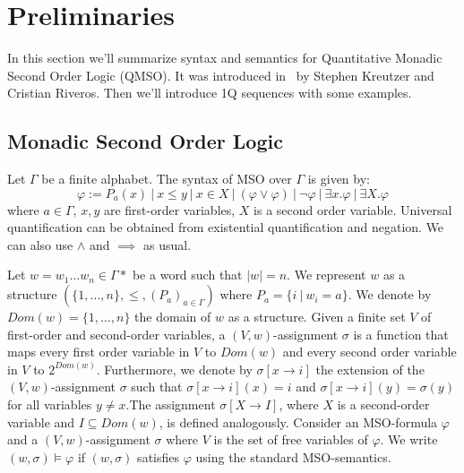 \documentclass[12pt]{article}
\newcommand{\ifilip}[1]{\todo[inline,color=green!10]{{\bf Filip:} #1}}
\theoremstyle{definition}
\begin{document}



\section{Preliminaries}
In this section we'll summarize syntax and semantics for Quantitative Monadic Second Order Logic (QMSO). It was introduced in~\cite{KreutzerR13} by Stephen Kreutzer and Cristian Riveros. Then we'll introduce 1Q sequences with some examples.

\subsection{Monadic Second Order Logic}

Let $\Gamma$ be a finite alphabet. The syntax of MSO over $\Gamma$ is given by:
$$ \varphi := P_a(x) \ | \ x \leq y \ | \ x \in X \ | \ (\varphi \lor \varphi) \ | \ \neg \varphi \ | \ \exists x. \varphi \ | \ \exists X . \varphi $$
where $a \in \Gamma$, $x, y$ are first-order variables, $X$ is a second order variable. Universal quantification can be obtained from existential quantification and negation. We can also use $\land$ and $\implies$ as usual.

Let $w = w_1\ldots w_n \in \Gamma*$ be a word such that $|w| = n$. We represent $w$ as a structure $(\{1,\ldots,n\}, \leq, (P_a)_{a \in \Gamma})$ where $P_a = \{i \ | \ w_i = a\}$. We denote by $Dom(w) = \{1,\ldots,n\}$ the domain of $w$ as a structure. Given a finite set $V$ of first-order and second-order variables, a $(V,w)$-assignment $\sigma$ is a function that maps every first order variable in $V$ to $Dom(w)$ and every second order variable in $V$ to $2^{Dom(w)}$. Furthermore, we denote by $\sigma[x \rightarrow i]$ the extension of the $(V,w)$-assignment $\sigma$ such that $\sigma[x \rightarrow i](x) = i$ and $\sigma[x \rightarrow i](y) = \sigma(y)$ for all variables $y \ne x$.The assignment $\sigma[X \rightarrow I]$, where $X$ is a second-order variable and $I \subseteq Dom(w)$, is defined analogously. Consider an MSO-formula $\varphi$ and a $(V,w)$-assignment $\sigma$ where $V$ is the set of free variables of $\varphi$. We write $(w, \sigma) \models \varphi$ if $(w, \sigma)$ satisfies $\varphi$ using the standard MSO-semantics.
\end{document}
